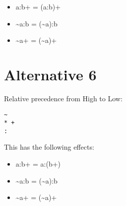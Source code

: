 \documentclass[letterpaper,12pt]{article}
\begin{document}
\begin{itemize}
\item
a:b+ =  (a:b)+
\item
\~{}a:b = (\~{}a):b
\item
\~{}a+ = (\~{}a)+
\end{itemize}

\section{Alternative 6}

Relative precedence from High to Low:

\begin{Verbatim}[fontsize=\small]
~
* +
:
\end{Verbatim}

\noindent
This has the following effects:

\begin{itemize}
\item
a:b+ =  a:(b+)
\item
\~{}a:b = (\~{}a):b
\item
\~{}a+ = (\~{}a)+
\end{itemize}
\end{document}
